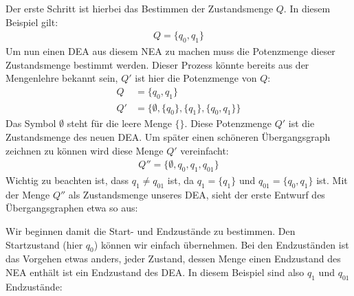 \begin{flushleft}
    Der erste Schritt ist hierbei das Bestimmen der Zustandsmenge $Q$. In diesem Beispiel gilt:
    \begin{align}
        Q=\{q_0,q_1\}
    \end{align}
    Um nun einen DEA aus diesem NEA zu machen muss die Potenzmenge dieser Zustandsmenge bestimmt werden.
    Dieser Prozess könnte bereits aus der Mengenlehre bekannt sein, $Q'$ ist hier die Potenzmenge von $Q$:
    \begin{align}
        Q &=\{q_0,q_1\} \\
        Q' &=\{\emptyset,\{q_0\},\{q_1\},\{q_0,q_1\}\}
    \end{align}
    Das Symbol $\emptyset$ steht für die leere Menge $\{\}$. Diese Potenzmenge $Q'$ ist die Zustandsmenge 
    des neuen DEA. Um später einen schöneren Übergangsgraph zeichnen zu können wird diese Menge $Q'$ vereinfacht:
    \begin{align}
        Q'' =\{\emptyset,q_0,q_1,q_{01}\}
    \end{align}
    Wichtig zu beachten ist, dass $q_1 \neq q_{01}$ ist, da $q_1=\{q_1\}$ und $q_{01}=\{q_0,q_1\}$ ist.
    Mit der Menge $Q''$ als Zustandsmenge unseres DEA, sieht der erste Entwurf des Übergangsgraphen etwa so aus:
\end{flushleft}
    
\begin{center}
\end{center}

\begin{flushleft}
    Wir beginnen damit die Start- und Endzustände zu bestimmen. Den Startzustand (hier $q_0$) können 
    wir einfach übernehmen. Bei den Endzuständen ist das Vorgehen etwas anders, jeder Zustand, dessen Menge 
    einen Endzustand des NEA enthält ist ein Endzustand des DEA. In diesem Beispiel sind also $q_1$ und $q_{01}$
    Endzustände:
\end{flushleft}
    
\begin{center}
\end{center}

